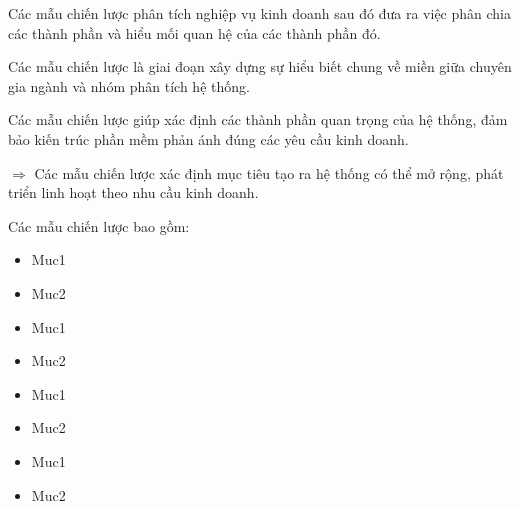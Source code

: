 Các mẫu chiến lược phân tích nghiệp vụ kinh doanh sau đó đưa ra việc phân chia các thành phần và hiểu mối quan hệ của các thành phần đó.

Các mẫu chiến lược là giai đoạn xây dựng sự hiểu biết chung về miền giữa chuyên gia ngành và nhóm phân tích hệ thống.

Các mẫu chiến lược giúp xác định các thành phần quan trọng của hệ thống, đảm bảo kiến trúc phần mềm phản ánh đúng các yêu cầu kinh doanh.

$\Rightarrow$ Các mẫu chiến lược xác định mục tiêu tạo ra hệ thống có thể mở rộng, phát triển linh hoạt theo nhu cầu kinh doanh.

Các mẫu chiến lược bao gồm:

\begin{itemize}







\item Muc1

\item Muc2

\item Muc1

\item Muc2

\item Muc1

\item Muc2

\item Muc1

\item Muc2

\end{itemize}






